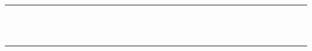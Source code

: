 \documentclass[a4paper]{article}
\begin{document}
\begin{table}[!htbp]
\begin{tabular}{|l|l|l|l|l|l|l|l|l|l|l|l|l|l|l|l|l|l|l|l|l|l|l|l|l|l|l|l|l|l|l|l|l|l|l|l|}
 & & & & & & & \cellcolor{mygray} & & & & & \cellcolor{mygray} & \cellcolor{mygray} & \cellcolor{mygray} & & & & & \cellcolor{mygray} & & & & & & & & & & & & & & & & \\ \hline 
 & & & & & & & & \cellcolor{mygray} & & & & & \cellcolor{mygray} & \cellcolor{mygray} & \cellcolor{mygray} & & & & & \cellcolor{mygray} & & & & & & & & & & & & & & & \\ \hline 
 & & & & & & & & & \cellcolor{mygray} & & & & & \cellcolor{mygray} & \cellcolor{mygray} & \cellcolor{mygray} & & & & & \cellcolor{mygray} & & & & & & & & & & & & & & \\ \hline 
 & & & & & & & & & & \cellcolor{mygray} & & & & & \cellcolor{mygray} & \cellcolor{mygray} & \cellcolor{mygray} & & & & & \cellcolor{mygray} & & & & & & & & & & & & & \\ \hline 
 & & & & & & & & & & & & & & & & & & & & & & & & & & & & & & & & & & & \\ \hline 
 & & & & & & & & & & & & & & & & & & & & & & & & & & & & & & & & & & & \\ \hline 
 & & & & & & & & & & & & & \cellcolor{mygray} & & & & & \cellcolor{mygray} & \cellcolor{mygray} & \cellcolor{mygray} & & & & & \cellcolor{mygray} & & & & & & & & & & \\ \hline 
 & & & & & & & & & & & & & & \cellcolor{mygray} & & & & & \cellcolor{mygray} & \cellcolor{mygray} & \cellcolor{mygray} & & & & & \cellcolor{mygray} & & & & & & & & & \\ \hline 
 & & & & & & & & & & & & & & & \cellcolor{mygray} & & & & & \cellcolor{mygray} & \cellcolor{mygray} & \cellcolor{mygray} & & & & & \cellcolor{mygray} & & & & & & & & \\ \hline 
 & & & & & & & & & & & & & & & & \cellcolor{mygray} & & & & & \cellcolor{mygray} & \cellcolor{mygray} & \cellcolor{mygray} & & & & & \cellcolor{mygray} & & & & & & & \\ \hline 
 & & & & & & & & & & & & & & & & & & & & & & & & & & & & & & & & & & & \\ \hline 
 & & & & & & & & & & & & & & & & & & & & & & & & & & & & & & & & & & & \\ \hline 
 & & & & & & & & & & & & & & & & & & & \cellcolor{mygray} & & & & & \cellcolor{mygray} & \cellcolor{mygray} & \cellcolor{mygray} & & & & & \cellcolor{mygray} & & & & \\ \hline 
 & & & & & & & & & & & & & & & & & & & & \cellcolor{mygray} & & & & & \cellcolor{mygray} & \cellcolor{mygray} & \cellcolor{mygray} & & & & & \cellcolor{mygray} & & & \\ \hline 

\end{tabular}
\end{table}
\end{document}
